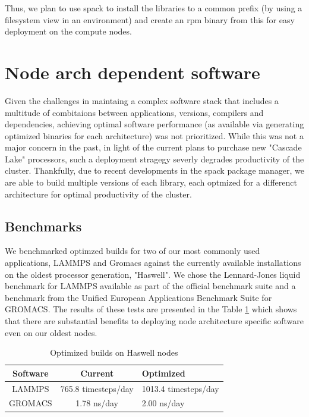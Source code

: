 \documentclass[sigconf,authordraft]{acmart}
\begin{document}
Thus, we plan to use spack \cite{spack} to install the libraries to a common prefix (by using a filesystem view in an environment) and create an rpm binary from this for easy deployment on the compute nodes.

\section{Node arch dependent software}

Given the challenges in maintaing a complex software stack that includes a multitude of combitaions between applications, versions, compilers and dependencies, achieving optimal software performance (as available via generating optimized binaries for each architecture) was 
not prioritized. While this was not a major concern in the past, in light of the current plans to purchase new "Cascade Lake" processors, such a deployment stragegy severly degrades productivity of the cluster. Thankfully, due to recent developments in the spack package manager, we are able to build multiple versions of each library, each optmized for a differenct architecture for optimal productivity of the cluster. 

\subsection{Benchmarks}
We benchmarked optimzed builds for two of our most commonly used applications, LAMMPS\cite{lammps} and Gromacs\cite{gromacs_1995,gromacs_2015} against the currently available installations on the oldest processor generation, "Haswell". We chose the Lennard-Jones liquid benchmark for LAMMPS available as part of the official benchmark suite \cite{lammps_bench} and a benchmark from the Unified European Applications Benchmark Suite \cite{ueabs_prace,ueabs_repo} for GROMACS. The results of these tests are presented in the Table \ref{tab:bench_apps} which shows that there are substantial benefits to deploying node architecture specific software even on our oldest nodes.

\begin{table}
	\caption{Optimized builds on Haswell nodes}
	\label{tab:bench_apps}
	\begin{tabular}{ccl}
		\toprule
		Software &Current&Optimized\\
		\midrule
		LAMMPS & 765.8 timesteps/day&1013.4 timesteps/day\\
		GROMACS & 1.78 ns/day&2.00 ns/day\\
		\bottomrule
	\end{tabular}
\end{table}
\end{document}
